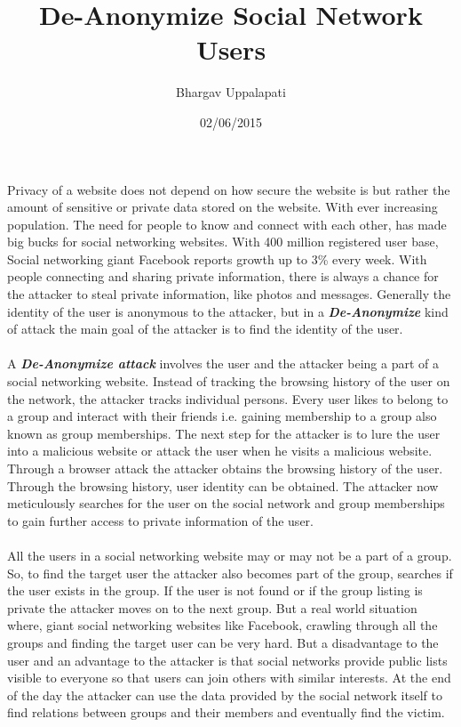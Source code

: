 \documentclass{article}
\title{De-Anonymize Social Network Users}
\author{Bhargav Uppalapati}
\date{02/06/2015}
\begin{document}
\maketitle
Privacy of a website does not depend on how secure the website is but rather the amount of sensitive or private data stored on the website. With ever increasing population. The need for people to know and connect with each other, has made big bucks for social networking websites. With 400 million registered user base, Social networking giant Facebook reports growth up to 3\% every week. With people connecting and sharing private information, there is always a chance for the attacker to steal private information, like photos and messages. Generally the identity of the user is anonymous to the attacker, but in a \textbf{\textit{De-Anonymize}}  kind of attack the main goal of the attacker is to find the identity of the user.
\\
\\
A \textbf{\textit{De-Anonymize attack}} involves the user and the attacker being a part of a social networking website. Instead of tracking the browsing history of the user on the network, the attacker tracks individual persons. Every user likes to belong to a group and interact with their friends i.e. gaining membership to a group also known as group memberships. The next step for the attacker is to lure the user into a malicious website or attack the user when he visits a malicious website. Through a browser attack the attacker obtains the browsing history of the user. Through the browsing history, user identity can be obtained. The attacker now meticulously searches for the user on the social network and group memberships to gain further access to private information of the user.
\\
\\
All the users in a social networking website may or may not be a part of a group. So, to find the target user the attacker also becomes part of the group, searches if the user exists in the group. If the user is not found or if the group listing is private the attacker moves on to the next group. But a real world situation where, giant social networking websites like Facebook, crawling through all the groups and finding the target user can be very hard. But a disadvantage to the user and an advantage to the attacker is that social networks provide public lists visible to everyone so that users can join others with similar interests. At the end of the day the attacker can use the data provided by the social network itself to find relations between groups and their members and eventually find the victim.
\end{document}
